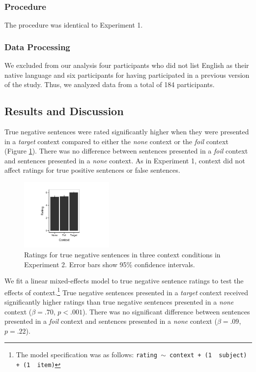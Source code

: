 \documentclass[10pt,letterpaper]{article}
\begin{document}
\subsubsection{Procedure}

The procedure was identical to Experiment 1.

\subsubsection{Data Processing}

We excluded from our analysis four participants who did not list English as their native language and six participants for having participated in a previous version of the study.  Thus, we analyzed data from a total of 184 participants.  

\subsection{Results and Discussion}

True negative sentences were rated significantly higher when they were presented in a \emph{target} context compared to either the \emph{none} context or the \emph{foil} context (Figure \ref{fig:s2}).  There was no difference between sentences presented in a \emph{foil} context and sentences presented in a \emph{none} context.  As in Experiment 1, context did not affect ratings for true positive sentences or false sentences.  

\begin{figure}
\begin{center} 
\includegraphics[width=1.8in]{figures/study2.pdf}
\caption{\label{fig:s2} Ratings for true negative sentences in three context conditions in Experiment 2.  Error bars show 95\% confidence intervals.}
\end{center} 
\end{figure}

We fit a linear mixed-effects model to true negative sentence ratings to test the effects of context.\footnote{ The model specification was as follows: \texttt{rating $\sim$ context + (1~\textbar~subject) +  (1~\textbar~item)}}  True negative sentences presented in a \emph{target} context received significantly higher ratings than true negative sentences presented in a \emph{none} context ($\beta= .70$, $p< .001$).  There was no significant difference between sentences presented in a \emph{foil} context and sentences presented in a \emph{none} context ($\beta= .09$, $p=.22$).
\end{document}
